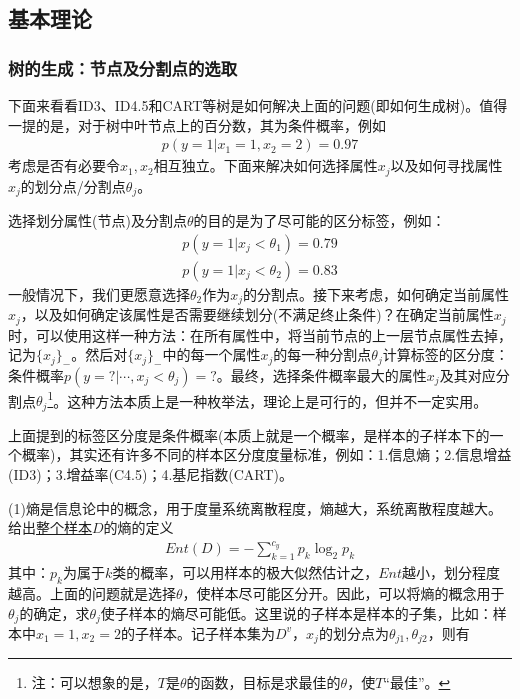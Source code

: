     \subsection{基本理论}
        \subsubsection{树的生成：节点及分割点的选取}
            \par
            下面来看看ID3、ID4.5和CART等树是如何解决上面的问题(即如何生成树)。值得一提的是，对于树中叶节点上的百分数，其为条件概率，例如
            \begin{align*}
            p(y=1|x_1=1,x_2=2) = 0.97
            \end{align*}
            考虑是否有必要令$x_1,x_2$相互独立。下面来解决如何选择属性$x_j$以及如何寻找属性$x_j$的划分点/分割点$\theta_j$。
            \par
            选择划分属性(节点)及分割点$\theta$的目的是为了尽可能的区分标签，例如：
            \begin{align*}
            p(y=1|x_j <\theta_1) = 0.79\\
            p(y=1|x_j <\theta_2) = 0.83
            \end{align*}
            一般情况下，我们更愿意选择$\theta_2$作为$x_j$的分割点。接下来考虑，如何确定当前属性$x_j$，以及如何确定该属性是否需要继续划分(不满足终止条件)？在确定当前属性$x_j$时，可以使用这样一种方法：在所有属性中，将当前节点的上一层节点属性去掉，记为$\{x_j\}_-$。然后对$\{x_j\}_-$中的每一个属性$x_j$的每一种分割点$\theta_j$计算标签的区分度：条件概率$p(y=?|\cdots,x_j<\theta_j)=?$。最终，选择条件概率最大的属性$x_j$及其对应分割点$\theta_j$\footnote{注：可以想象的是，$T$是$\theta$的函数，目标是求最佳的$\theta$，使$T$“最佳”。}。这种方法本质上是一种枚举法，理论上是可行的，但并不一定实用。
            \par
            上面提到的标签区分度是条件概率(本质上就是一个概率，是样本的子样本下的一个概率)，其实还有许多不同的样本区分度度量标准，例如：1.信息熵；2.信息增益(ID3)；3.增益率(C4.5)；4.基尼指数(CART)。
            \par
            (1)熵是信息论中的概念，用于度量系统离散程度，熵越大，系统离散程度越大。给出\underline{整个样本$D$}的熵的定义
            \begin{align*}
            Ent(D) = -\sum_{k=1}^{c_y}p_k \log_2 p_k
            \end{align*}
            其中：$p_k$为属于$k$类的概率，可以用样本的极大似然估计之，$Ent$越小，划分程度越高。上面的问题就是选择$\theta$，使样本尽可能区分开。因此，可以将熵的概念用于$\theta_j$的确定，求$\theta_j$使子样本的熵尽可能低。这里说的子样本是样本的子集，比如：样本中$x_1 = 1,x_2 = 2$的子样本。记子样本集为$D^v$，$x_j$的划分点为$\theta_{j1},\theta_{j2}$，则有
